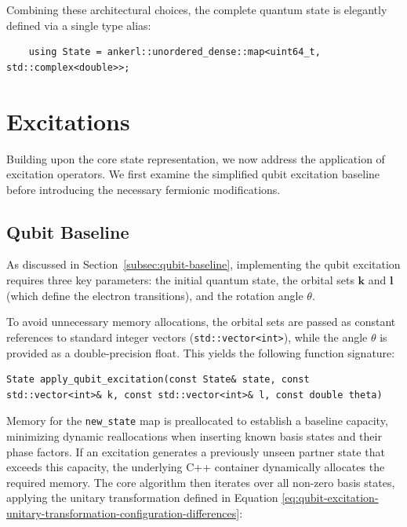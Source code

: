 Combining these architectural choices, the complete quantum state is elegantly defined via a single type alias:

\begin{verbatim}
    using State = ankerl::unordered_dense::map<uint64_t, std::complex<double>>;
\end{verbatim}

\section{Excitations}
Building upon the core state representation, we now address the application of excitation operators. We first examine the simplified qubit excitation baseline before introducing the necessary fermionic modifications.

\subsection{Qubit Baseline}
As discussed in Section~\ref{subsec:qubit-baseline}, implementing the qubit excitation requires three key parameters: the initial quantum state, the orbital sets $\boldsymbol{k}$ and $\boldsymbol{l}$ (which define the electron transitions), and the rotation angle $\theta$.

To avoid unnecessary memory allocations, the orbital sets are passed as constant references to standard integer vectors (\texttt{std::vector<int>}), while the angle $\theta$ is provided as a double-precision float. This yields the following function signature:

\begin{verbatim}
State apply_qubit_excitation(const State& state, const std::vector<int>& k, const std::vector<int>& l, const double theta)
\end{verbatim}

Memory for the \texttt{new\_state} map is preallocated to establish a baseline capacity, minimizing dynamic reallocations when inserting known basis states and their phase factors. If an excitation generates a previously unseen partner state that exceeds this capacity, the underlying C++ container dynamically allocates the required memory. The core algorithm then iterates over all non-zero basis states, applying the unitary transformation defined in Equation \eqref{eq:qubit-excitation-unitary-transformation-configuration-differences}:

